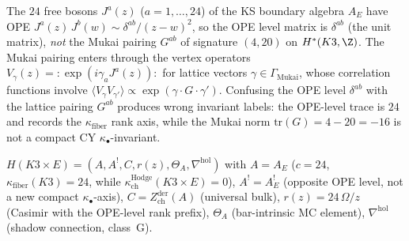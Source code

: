 \begin{remark}
\label{rem:ope-level-mukai}
The $24$ free bosons $J^a(z)$ ($a = 1, \ldots, 24$) of the KS
boundary algebra $A_E$ have OPE
$J^a(z)\,J^b(w) \sim \delta^{ab}/(z-w)^2$,
so the OPE level matrix is $\delta^{ab}$ (the unit matrix),
\emph{not} the Mukai pairing $G^{ab}$ of signature $(4,20)$ on
$H^*(K3, \Z)$. The Mukai pairing enters through the vertex
operators $V_\gamma(z) = {:}\!\exp(i\gamma_a J^a(z))\!{:}$
for lattice vectors $\gamma \in \Gamma_{\mathrm{Mukai}}$,
whose correlation functions involve
$\langle V_\gamma V_{\gamma'} \rangle \propto
\exp(\gamma \cdot G \cdot \gamma')$. Confusing the OPE level
$\delta^{ab}$ with the lattice pairing $G^{ab}$ produces wrong
invariant labels: the OPE-level trace is $24$ and records the
$\kappa_{\mathrm{fiber}}$ rank axis, while the Mukai norm
$\mathrm{tr}(G) = 4 - 20 = -16$ is not a compact CY
$\kappa_\bullet$-invariant.
\end{remark}

\begin{remark}
\label{rem:holo-koszul-k3xe}
$H(K3 \times E) = (A, A^!, C, r(z), \Theta_A,
\nabla^{\mathrm{hol}})$ with
$A = A_E$ ($c = 24$, $\kappa_{\mathrm{fiber}}(K3) = 24$, while
$\kappa_{\mathrm{ch}}^{\mathrm{Hodge}}(K3\times E)=0$),
$A^! = A_E^!$ (opposite OPE level, not a new compact
$\kappa_\bullet$-axis),
$C = Z^{\mathrm{der}}_{\mathrm{ch}}(A)$ (universal bulk),
$r(z) = 24\,\Omega/z$ (Casimir with the OPE-level rank prefix),
$\Theta_A$ (bar-intrinsic MC element),
$\nabla^{\mathrm{hol}}$ (shadow connection, class~G).
\end{remark}

